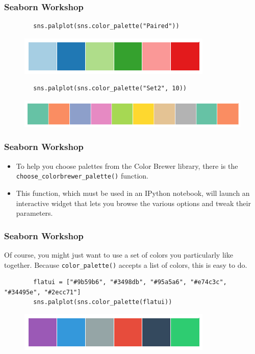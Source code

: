 \documentclass{beamer}
\begin{document}
	\begin{frame}[fragile]
		\frametitle{Seaborn Workshop}
		\large
		\begin{verbatim}
		sns.palplot(sns.color_palette("Paired"))
		\end{verbatim}
		
		\begin{figure}
			\centering
			\includegraphics[width=0.7\linewidth]{images/color_palettes_16_0}
		\end{figure}
		\bigskip
		\begin{verbatim}
		sns.palplot(sns.color_palette("Set2", 10))
		\end{verbatim}
		\begin{figure}
			\centering
			\includegraphics[width=0.7\linewidth]{images/color_palettes_17_0}
			
		\end{figure}
	\end{frame}
	\begin{frame}[fragile]
		\frametitle{Seaborn Workshop}
		\large
		\begin{itemize}
			\item To help you choose palettes from the Color Brewer library, there is the \texttt{choose\_colorbrewer\_palette()} function.
			\item This function, which must be used in an IPython notebook, will launch an interactive widget that lets you browse the various options and tweak their parameters.
		\end{itemize}
		
	\end{frame}
	\begin{frame}[fragile]
		\frametitle{Seaborn Workshop}
		\large
		
		Of course, you might just want to use a set of colors you particularly like together. Because \texttt{color\_palette()} accepts a list of colors, this is easy to do.
		\begin{verbatim}
		flatui = ["#9b59b6", "#3498db", "#95a5a6", "#e74c3c", "#34495e", "#2ecc71"]
		sns.palplot(sns.color_palette(flatui))
		\end{verbatim}
		\begin{figure}
			\centering
			\includegraphics[width=0.7\linewidth]{images/color_palettes_19_0}
		\end{figure}
	\end{frame}
\end{document}
